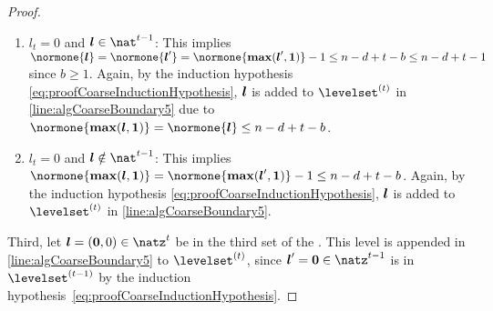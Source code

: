 \begin{proof}
\begin{enumerate}
    \item
    $l_t = 0$ and $\*l \in \nat^{t-1}$:
    This implies $\normone{\*l} = \normone{\*l'}
    = \normone{\vecmax(\*l', \*1)} - 1
    \le n - d + t - b
    \le n - d + t - 1$ since $b \ge 1$.
    Again, by the induction hypothesis
    \eqref{eq:proofCoarseInductionHypothesis},
    ${\boldsymbol{l}}$ is added to $\levelset^{(t)}$ in \cref{line:algCoarseBoundary5}
    due to
    $\normone{\vecmax(\*l, \*1)}
    = \normone{\*l} \le n - d + t - b$.
    
    \item
    $l_t = 0$ and $\*l \notin \nat^{t-1}$:
    This implies $\normone{\vecmax(\*l, \*1)}
    = \normone{\vecmax(\*l', \*1)} - 1
    \le n - d + t - b$.
    Again, by the induction hypothesis
    \eqref{eq:proofCoarseInductionHypothesis},
    ${\boldsymbol{l}}$ is added to $\levelset^{(t)}$ in \cref{line:algCoarseBoundary5}.
  \end{enumerate}
  
  \noindent
  Third, let $\*l = (\vec{0}, 0) \in \natz^t$
  be in the third set of the \rhs.
  This level is appended in \cref{line:algCoarseBoundary5}
  to $\levelset^{(t)}$, since $\*l' = \vec{0} \in \natz^{t-1}$
  is in $\levelset^{(t-1)}$ by the
  induction hypothesis~\eqref{eq:proofCoarseInductionHypothesis}.
\end{proof}
